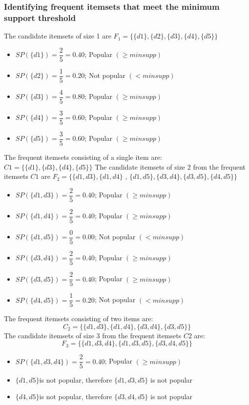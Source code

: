 \subsubsection{Identifying frequent itemsets that meet the minimum support threshold}
The candidate itemsets of size 1 are \(F_1=\{\{d1\},\{d2\},\{d3\},\{d4\},\{d5\}\}\)
\begin{itemize}
\item \(SP(\{d1\})=\dfrac{2}{5}=0.40\); Popular \((\geq minsupp)\)
\item \(SP(\{d2\})=\dfrac{1}{5}=0.20\); Not popular  \((< minsupp)\)
\item \(SP(\{d3\})=\dfrac{4}{5}=0.80\); Popular  \((\geq minsupp)\)
\item \(SP(\{d4\})=\dfrac{3}{5}=0.60\); Popular  \((\geq minsupp)\)
\item \(SP(\{d5\})=\dfrac{3}{5}=0.60\); Popular  \((\geq minsupp)\)
\end{itemize}
The frequent itemsets consisting of a single item are: \(C1=\{\{d1\},\{d3\},\{d4\},\{d5\}\}\)
The candidate itemsets of size 2 from the frequent itemsets \(C1\) are \(F_2=\{\{d1,d3\},\{d1,d4\}\) , \(\{d1,d5\},\{d3,d4\},\{d3,d5\},\{d4,d5\}\}\)
\begin{itemize}
\item \(SP(\{d1,d3\})=\dfrac{2}{5}=0.40\); Popular  \((\geq minsupp)\)
\item \(SP(\{d1,d4\})=\dfrac{2}{5}=0.40\); Popular  \((\geq minsupp)\)
\item \(SP(\{d1,d5\})=\dfrac{0}{5}=0.00\); Not popular  \((< minsupp)\)
\item \(SP(\{d3,d4\})=\dfrac{2}{5}=0.40\); Popular  \((\geq minsupp)\)
\item \(SP(\{d3,d5\})=\dfrac{2}{5}=0.40\); Popular  \((\geq minsupp)\)
\item \(SP(\{d4,d5\})=\dfrac{1}{5}=0.20\); Not popular  \((< minsupp)\)
\end{itemize}
The frequent itemsets consisting of two items are: \[C_2=\{\{d1,d3\},\{d1,d4\},\{d3,d4\},\{d3,d5\}\}\]
The candidate itemsets of size 3 from the frequent itemsets \(C2\) are: \[F_3=\{\{d1,d3,d4\},\{d1,d3,d5\},\{d3,d4,d5\}\}\]
\begin{itemize}
\item \(SP(\{d1,d3,d4\})=\dfrac{2}{5}=0.40\); Popular  \((\geq minsupp)\)
\item \(\{d1,d5\}\)is not popular, therefore \(\{d1,d3,d5\}\) is not popular
\item \(\{d4,d5\}\)is not popular, therefore \(\{d3,d4,d5\}\) is not popular
\end{itemize}
